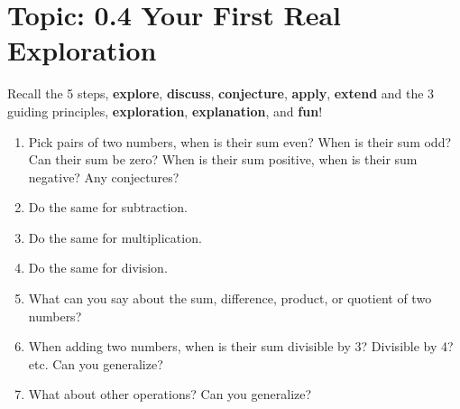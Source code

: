 \documentclass[12pt,letterpaper]{article}
\begin{document}
\section*{Topic: 0.4 Your First Real Exploration}
Recall the 5 steps, \textbf{explore}, \textbf{discuss}, \textbf{conjecture}, \textbf{apply}, \textbf{extend} and the 3 guiding principles, \textbf{exploration}, \textbf{explanation}, and \textbf{fun}!

\begin{enumerate}
    \item Pick pairs of two numbers, when is their sum even? When is their sum odd? Can their sum be zero? When is their sum positive, when is their sum negative? Any conjectures?
    \item Do the same for subtraction.
    \item Do the same for multiplication.
    \item Do the same for division.
    \item What can you say about the sum, difference, product, or quotient of two numbers?
    \item When adding two numbers, when is their sum divisible by 3? Divisible by 4? etc. Can you generalize?
    \item What about other operations? Can you generalize?
\end{enumerate}
\end{document}
